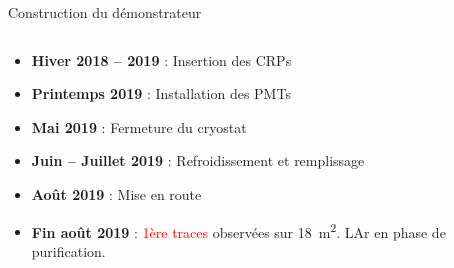 \begin{frame}{Construction du démonstrateur}
\begin{columns}
\begin{column}{0.55\textwidth}
\begin{scriptsize}
\begin{itemize}
                        \item \textbf{Hiver 2018 -- 2019} : Insertion des CRPs
                        \item \textbf{Printemps 2019} : Installation des PMTs
                        \item \textbf{Mai 2019} : Fermeture du cryostat
                        \item \textbf{Juin -- Juillet 2019} : Refroidissement et remplissage 
                        \item \textbf{Août 2019} : Mise en route
                        \item \textbf{Fin août 2019} : \textcolor{red}{1ère traces} observées sur \SI{18}{\meter\squared}. LAr en phase de purification.
                    \end{itemize}
                \end{scriptsize}
            \end{column}
        \end{columns}
    \end{frame}
    
    {
      	\setlength\pdfpagewidth{12.8cm}%
      	\setlength\pdfpageheight{9cm}%
      	\begin{specialframe}
          	\vspace{-0.42cm}\hspace{-2.1cm}
      	\end{specialframe}
    }
    
    
    {\iftracks
       	\setlength\pdfpagewidth{12.8cm}%
       	\setlength\pdfpageheight{6.95cm}%
       	\begin{frame}[plain]
       	\end{frame}
     \fi}

